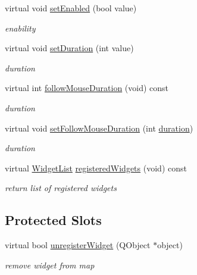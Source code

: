 \begin{DoxyCompactItemize}
virtual void \hyperlink{class_menu_engine_v2_a636dca1da0caffa85542ae84eb7d479d}{set\+Enabled} (bool value)
\begin{DoxyCompactList}\small\item\em enability \end{DoxyCompactList}\item 
\mbox{\label{class_menu_engine_v2_aac721201d4a0abf05b98031f2f1d6555}} 
virtual void \hyperlink{class_menu_engine_v2_aac721201d4a0abf05b98031f2f1d6555}{set\+Duration} (int value)
\begin{DoxyCompactList}\small\item\em duration \end{DoxyCompactList}\item 
\mbox{\label{class_menu_engine_v2_af11f65c85758e00653f35a59673886cc}} 
virtual int \hyperlink{class_menu_engine_v2_af11f65c85758e00653f35a59673886cc}{follow\+Mouse\+Duration} (void) const
\begin{DoxyCompactList}\small\item\em duration \end{DoxyCompactList}\item 
\mbox{\label{class_menu_engine_v2_a349db4a0c0a89b6b069210db7ba1483a}} 
virtual void \hyperlink{class_menu_engine_v2_a349db4a0c0a89b6b069210db7ba1483a}{set\+Follow\+Mouse\+Duration} (int \hyperlink{class_base_engine_a7edb8da9d2fd6cca19682d1d089dfa4b}{duration})
\begin{DoxyCompactList}\small\item\em duration \end{DoxyCompactList}\item 
\mbox{\label{class_menu_engine_v2_a173b5a134ccd81209e0e77e00e505f80}} 
virtual \hyperlink{class_base_engine_a2b0faec98a7eb68c91b502459c46a9c7}{Widget\+List} \hyperlink{class_menu_engine_v2_a173b5a134ccd81209e0e77e00e505f80}{registered\+Widgets} (void) const
\begin{DoxyCompactList}\small\item\em return list of registered widgets \end{DoxyCompactList}\end{DoxyCompactItemize}
\subsection*{Protected Slots}
\begin{DoxyCompactItemize}
\item 
\mbox{\label{class_menu_engine_v2_a883753b75f97cefd71f097d13014828d}} 
virtual bool \hyperlink{class_menu_engine_v2_a883753b75f97cefd71f097d13014828d}{unregister\+Widget} (Q\+Object $\ast$object)
\begin{DoxyCompactList}\small\item\em remove widget from map \end{DoxyCompactList}\end{DoxyCompactItemize}

